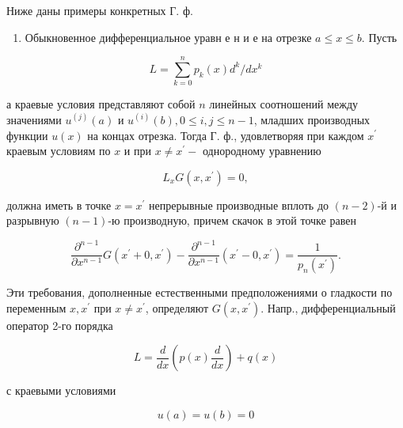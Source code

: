 \documentclass[10pt]{article}
\begin{document}
Ниже даны примеры конкретных Г. ф.



\begin{enumerate}

  \item Обыкновенное дифференциальное уравн е н и е на отрезке $a \leqslant x \leqslant b$. Пусть

\end{enumerate}



\[

L=\sum_{k=0}^{n} p_{k}(x) d^{k} / d x^{k}

\]



а краевые условия представляют собой $n$ линейных соотношений между значениями $u^{(j)}(a)$ и $u^{(i)}(b), 0 \leqslant i, j \leqslant n-1$, младших производных функции $u(x)$ на концах отрезка. Тогда Г. ф., удовлетворяя при каждом $x^{\prime}$ краевым условиям по $x$ и при $x \neq x^{\prime}-$ однородному уравнению



\[

L_{x} G\left(x, x^{\prime}\right)=0,

\]



должна иметь в точке $x=x^{\prime}$ непрерывные производные вплоть до $(n-2)$-й и разрывную $(n-1)$-ю производную, причем скачок в этой точке равен



\[

\frac{\partial^{n-1}}{\partial x^{n-1}} G\left(x^{\prime}+0, x^{\prime}\right)-\frac{\partial^{n-1}}{\partial x^{n-1}}\left(x^{\prime}-0, x^{\prime}\right)=\frac{1}{p_{n}\left(x^{\prime}\right)} .

\]



Эти требования, дополненные естественными предположениями о гладкости по переменным $x, x^{\prime}$ при $x \neq x^{\prime}$, определяют $G\left(x, x^{\prime}\right)$. Напр., дифференциальный оператор 2-го порядка



\[

L=\frac{d}{d x}\left(p(x) \frac{d}{d x}\right)+q(x)

\]



с краевыми условиями



\[

u(a)=u(b)=0

\]
\end{document}
